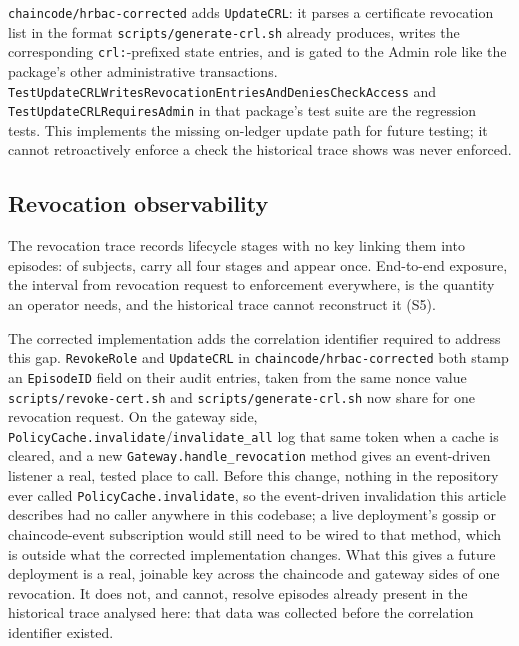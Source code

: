 \documentclass[a4paper,fleqn]{cas-sc}
\begin{document}
\texttt{chaincode/hrbac-corrected} adds \texttt{UpdateCRL}: it parses a
certificate revocation list in the format
\texttt{scripts/generate-crl.sh} already produces, writes the
corresponding \texttt{crl:}-prefixed state entries, and is gated to the
Admin role like the package's other administrative transactions.
\texttt{TestUpdateCRLWrites\-RevocationEntries\-AndDeniesCheckAccess} and
\texttt{TestUpdateCRLRequiresAdmin} in that package's test suite are the
regression tests. This implements the missing on-ledger update path for future testing; it cannot
retroactively enforce a check the historical trace shows was never
enforced.

\subsection{Revocation observability}
\label{subsec:pm_revocation}

The revocation trace records lifecycle stages with no key linking them
into episodes: of \RevSubjects{} subjects, \RevComplete{} carry all four
stages and \RevSingleStage{} appear once. End-to-end exposure, the
interval from revocation request to enforcement everywhere, is the
quantity an operator needs, and the historical trace cannot reconstruct it
(S5).

The corrected implementation adds the correlation identifier required to address this gap. \texttt{RevokeRole} and
\texttt{UpdateCRL} in \texttt{chaincode/hrbac-corrected} both stamp an
\texttt{EpisodeID} field on their audit entries, taken from the same nonce
value \texttt{scripts/revoke-cert.sh} and \texttt{scripts/generate-crl.sh}
now share for one revocation request. On the gateway side,
\texttt{PolicyCache.invalidate}/\texttt{invalidate\_all} log that same
token when a cache is cleared, and a new \texttt{Gateway.handle\_revocation}
method gives an event-driven listener a real, tested place to call. Before
this change, nothing in the repository ever called
\texttt{PolicyCache.invalidate}, so the event-driven invalidation this
article describes had no caller anywhere in this codebase; a live
deployment's gossip or chaincode-event subscription would still need to be
wired to that method, which is outside what the corrected implementation changes. What
this gives a future deployment is a real, joinable key across the
chaincode and gateway sides of one revocation. It does not, and cannot,
resolve episodes already present in the historical trace analysed here:
that data was collected before the correlation identifier existed.
\end{document}
